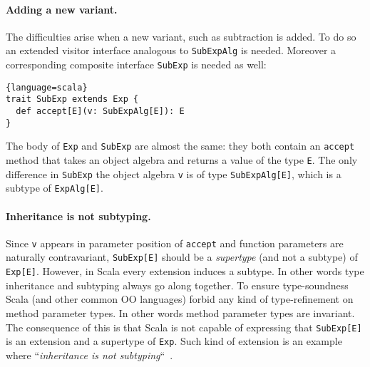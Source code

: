 \begin{comment}
The actual shape of the expressions
(i.e., variants) is determined by the type of the visitor, which we define in
another trait:
\begin{lstlisting}{language=scala}
trait ExpVisitor[E] {
  def lit(x: Int): E
  def add(e1: E, e2: E): E
}
\end{lstlisting}
\end{comment}

\paragraph{Adding a new variant.}
The difficulties arise when a new variant, such as subtraction is
added. To do so an extended visitor interface analogous to
\lstinline$SubExpAlg$ is needed. Moreover a corresponding composite 
interface \lstinline$SubExp$ is needed as well:
\begin{lstlisting}{language=scala}
trait SubExp extends Exp {
  def accept[E](v: SubExpAlg[E]): E
}
\end{lstlisting}
The body of \lstinline{Exp} and \lstinline{SubExp} are almost the same: they
both contain an \lstinline{accept} method that takes an object algebra 
and returns a value of the type \lstinline{E}. The only difference in
\lstinline{SubExp} the object algebra
\lstinline{v} is of type \lstinline{SubExpAlg[E]}, which is a subtype of
\lstinline{ExpAlg[E]}. 

\paragraph{Inheritance is not subtyping.}
Since \lstinline{v} appears in parameter position of
\lstinline{accept} and function parameters are naturally contravariant,
\lstinline{SubExp[E]} should be a \emph{supertype} (and not a subtype)
of \lstinline{Exp[E]}.  However, in Scala every extension induces a
subtype. In other words type inheritance and subtyping always go along
together.  To ensure type-soundness Scala (and other common OO
languages) forbid any kind of type-refinement on method parameter
types.  In other words method parameter types are invariant.
The consequence of this is that Scala is not capable of expressing
that \lstinline{SubExp[E]} is an extension and a supertype of
\lstinline{Exp}. Such kind of extension is an example where
``\emph{inheritance is not subtyping}``~\cite{cook1989inheritance}.

